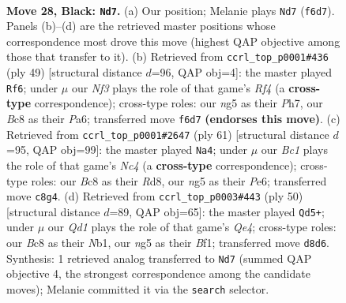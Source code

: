 \documentclass[11pt]{article}
\begin{document}
\clearpage

\begin{figure}[p]\centering
\begin{subfigure}{0.46\textwidth}\centering
\resizebox{\linewidth}{!}{%
\newchessgame
\chessboard[
  setfen={1Qbq1k2/P1p2p1p/2r2n2/3p2N1/5P2/8/2P3P1/R4RK1 b - - 0 28},
  showmover=false,
  pgfstyle=straightmove, color=movearrow, markmove={f6-d7}
]}
\caption{}
\end{subfigure}\hfill
\begin{subfigure}{0.46\textwidth}\centering
\resizebox{\linewidth}{!}{%
\newchessgame
\chessboard[
  setfen={6k1/6pp/p1p1q1n1/3ppr2/8/1PQ4P/P4PP1/2R1R1K1 b - - 3 25},
  showmover=false,
  pgfstyle=straightmove, color=movearrow, markmove={f5-f6}
]}
\caption{}
\end{subfigure}
\\[4pt]
\begin{subfigure}{0.46\textwidth}\centering
\resizebox{\linewidth}{!}{%
\newchessgame
\chessboard[
  setfen={3r2k1/6p1/1Qp1p2p/2n1q3/3r1N2/2R3P1/5P1P/5RK1 b - - 0 31},
  showmover=false,
  pgfstyle=straightmove, color=movearrow, markmove={c5-a4}
]}
\caption{}
\end{subfigure}\hfill
\begin{subfigure}{0.46\textwidth}\centering
\resizebox{\linewidth}{!}{%
\newchessgame
\chessboard[
  setfen={r6r/p4kpp/bp6/8/2P1Q3/6P1/P4P1P/qN2KB1R w K - 7 26},
  showmover=false,
  pgfstyle=straightmove, color=movearrow, markmove={e4-d5}
]}
\caption{}
\end{subfigure}
\caption{\textbf{Move 28, Black: \texttt{Nd7}.} (a) Our position; Melanie plays \texttt{Nd7} (\texttt{f6d7}). Panels (b)--(d) are the retrieved master positions whose correspondence most drove this move (highest QAP objective among those that transfer to it). (b) Retrieved from \texttt{ccrl\_top\_p0001\#436} (ply 49) [structural distance $d$=96, QAP obj=4]: the master played \texttt{Rf6}; under $\mu$ our \emph{Nf3} plays the role of that game's \emph{Rf4} (a \textbf{cross-type} correspondence); cross-type roles: our \emph{n}g5 as their \emph{P}h7, our \emph{B}c8 as their \emph{P}a6; transferred move \texttt{f6d7} \textbf{(endorses this move)}. (c) Retrieved from \texttt{ccrl\_top\_p0001\#2647} (ply 61) [structural distance $d$=95, QAP obj=99]: the master played \texttt{Na4}; under $\mu$ our \emph{Bc1} plays the role of that game's \emph{Nc4} (a \textbf{cross-type} correspondence); cross-type roles: our \emph{B}c8 as their \emph{R}d8, our \emph{n}g5 as their \emph{P}e6; transferred move \texttt{c8g4}. (d) Retrieved from \texttt{ccrl\_top\_p0003\#443} (ply 50) [structural distance $d$=89, QAP obj=65]: the master played \texttt{Qd5+}; under $\mu$ our \emph{Qd1} plays the role of that game's \emph{Qe4}; cross-type roles: our \emph{B}c8 as their \emph{N}b1, our \emph{n}g5 as their \emph{B}f1; transferred move \texttt{d8d6}. Synthesis: 1 retrieved analog transferred to \texttt{Nd7} (summed QAP objective 4, the strongest correspondence among the candidate moves); Melanie committed it via the \texttt{search} selector.}
\label{fig:thought-m55}
\end{figure}
\end{document}
